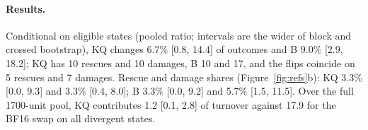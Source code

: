 \paragraph{Results.} Conditional on eligible states (pooled ratio; intervals are the wider of block and crossed bootstrap), KQ changes 6.7\% [0.8, 14.4] of outcomes and B 9.0\% [2.9, 18.2]; KQ has 10 rescues and 10 damages, B 10 and 17, and the flips coincide on 5 rescues and 7 damages. Rescue and damage shares (Figure~\ref{fig:refs}b): KQ 3.3\% [0.0, 9.3] and 3.3\% [0.4, 8.0]; B 3.3\% [0.0, 9.2] and 5.7\% [1.5, 11.5]. Over the full 1700-unit pool, KQ contributes 1.2\pp{} [0.1, 2.8] of turnover against 17.9\pp{} for the BF16 swap on all divergent states. %

